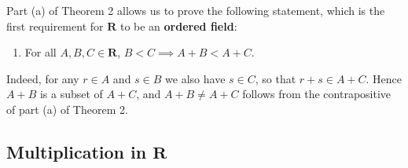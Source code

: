 \documentclass[12pt]{article}
\newcommand{\R}{\mathbf{R}}
\theoremstyle{definition}
\begin{document}
Part (a) of Theorem 2 allows us to prove the following statement, which is the first requirement for \( \R \) to be an \textbf{ordered field}:

\begin{enumerate}[label = (OF\arabic*), left = 6px]
    \item For all \( A, B, C \in \R \), \( B < C \implies A + B < A + C \).
\end{enumerate}

Indeed, for any \( r \in A \) and \( s \in B \) we also have \( s \in C \), so that \( r + s \in A + C \). Hence \( A + B \) is a subset of \( A + C \), and \( A + B \neq A + C\) follows from the contrapositive of part (a) of Theorem 2.

\subsection{Multiplication in \texorpdfstring{\(\R\)}{}}
\end{document}
